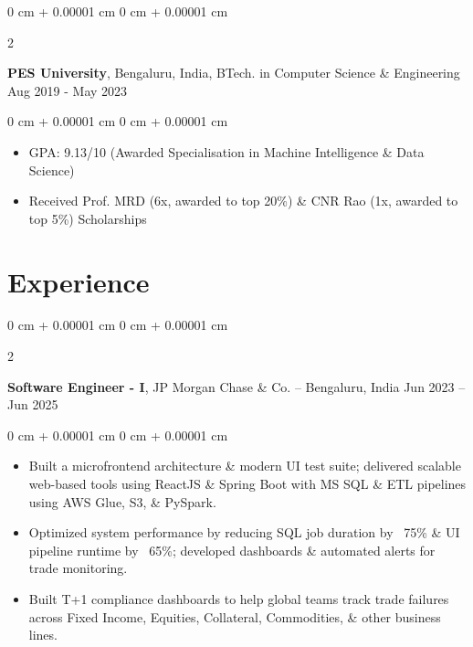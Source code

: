 \documentclass[10pt, a4paper]{article}
\newenvironment{highlights}{
    \begin{itemize}[
        topsep=0.10 cm,
        parsep=0.10 cm,
        partopsep=0pt,
        itemsep=0pt,
        leftmargin=0 cm + 10pt
    ]
}{
    \end{itemize}
} %
\newenvironment{onecolentry}{
    \begin{adjustwidth}{
        0 cm + 0.00001 cm
    }{
        0 cm + 0.00001 cm
    }
}{
    \end{adjustwidth}
} %
\newenvironment{twocolentry}[2][]{
    \onecolentry
    \def\secondColumn{#2}
    \setcolumnwidth{\fill, 6.0 cm}
    \begin{paracol}{2}
}{
    \switchcolumn \raggedleft \secondColumn
    \end{paracol}
    \endonecolentry
} %
\begin{document}
        \vspace{0.15 cm}
        \begin{twocolentry}{
            Aug 2019 - May 2023
        }
            \textbf{PES University}, Bengaluru, India, BTech. in Computer Science \& Engineering\end{twocolentry}

        \vspace{0.10 cm}
        \begin{onecolentry}
            \begin{highlights}
                \item GPA: 9.13/10 (Awarded Specialisation in Machine Intelligence \& Data Science)
                \item Received Prof. MRD (6x, awarded to top 20\%) \& CNR Rao (1x, awarded to top 5\%) Scholarships
            \end{highlights}
        \end{onecolentry}

    \section{Experience}
        \begin{twocolentry}{
            Jun 2023 – Jun 2025
        }
            \textbf{Software Engineer - I}, JP Morgan Chase \& Co. -- Bengaluru, India\end{twocolentry}
        \vspace{0.10 cm}
        \begin{onecolentry}
            \begin{highlights}
                \item Built a microfrontend architecture \& modern UI test suite; delivered scalable web-based tools using ReactJS \& Spring Boot with MS SQL \& ETL pipelines using AWS Glue, S3, \& PySpark.
                \item Optimized system performance by reducing SQL job duration by ~75\% \& UI pipeline runtime by ~65\%; developed dashboards \& automated alerts for trade monitoring.
                \item Built T+1 compliance dashboards to help global teams track trade failures across Fixed Income, Equities, Collateral, Commodities, \& other business lines.
            \end{highlights}
        \end{onecolentry}


        \vspace{0.15 cm}
\end{document}
